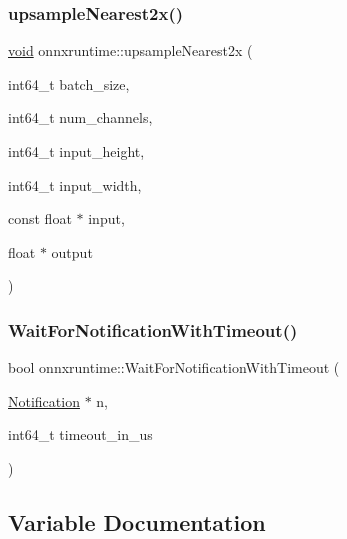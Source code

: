 \mbox{\label{namespaceonnxruntime_af713c6d00b41cfb59d618d830aba0dbc}} 
\subsubsection{\texorpdfstring{upsample\+Nearest2x()}{upsampleNearest2x()}}
{\footnotesize\ttfamily \mbox{\hyperlink{mlasi_8h_a88f941d423cb2a819b70a1358982b1a6}{void}} onnxruntime\+::upsample\+Nearest2x (\begin{DoxyParamCaption}\item[{int64\+\_\+t}]{batch\+\_\+size,  }\item[{int64\+\_\+t}]{num\+\_\+channels,  }\item[{int64\+\_\+t}]{input\+\_\+height,  }\item[{int64\+\_\+t}]{input\+\_\+width,  }\item[{const float $\ast$}]{input,  }\item[{float $\ast$}]{output }\end{DoxyParamCaption})}

\mbox{\label{namespaceonnxruntime_a06bd072ba3e8429ad1279d105addcd4a}} 
\subsubsection{\texorpdfstring{Wait\+For\+Notification\+With\+Timeout()}{WaitForNotificationWithTimeout()}}
{\footnotesize\ttfamily bool onnxruntime\+::\+Wait\+For\+Notification\+With\+Timeout (\begin{DoxyParamCaption}\item[{\mbox{\hyperlink{classonnxruntime_1_1Notification}{Notification}} $\ast$}]{n,  }\item[{int64\+\_\+t}]{timeout\+\_\+in\+\_\+us }\end{DoxyParamCaption})\hspace{0.3cm}{\ttfamily [inline]}}



\subsection{Variable Documentation}
\mbox{\label{namespaceonnxruntime_a2dba74e72194e59c7cb75bd0c838fb0b}} 
